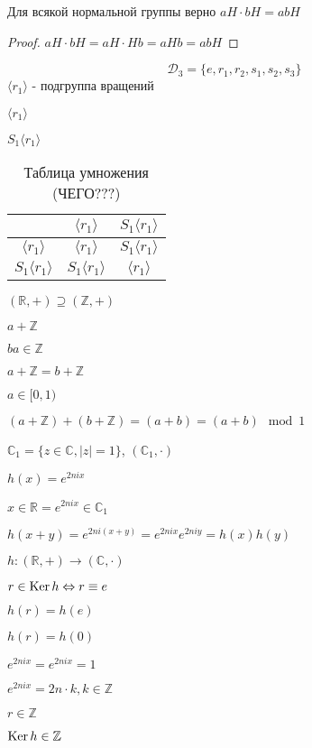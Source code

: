 \documentclass[../main/document.tex]{subfiles}
\begin{document}
\begin{cnsq}
Для всякой нормальной группы верно $aH\cdot bH=abH$
\begin{proof}
$aH\cdot bH=aH\cdot Hb=aHb=abH$
\end{proof}
\end{cnsq}

\begin{exm}
$$\mathcal{D}_3=\{e,r_1,r_2,s_1,s_2,s_3\}$$
$\langle r_1\rangle$ - подгруппа вращений

$\langle r_1\rangle$

$S_1\langle r_1\rangle$

\begin{table}[h]
\centering
\caption*{Таблица умножения (ЧЕГО???)}
\renewcommand*{\arraystretch}{1.4}
\begin{tabular}{c|c|c}
  & $\langle r_1\rangle$ & $S_1\langle r_1\rangle$ \\ \hline
$\langle r_1\rangle$ & $\langle r_1\rangle$ & $S_1\langle r_1\rangle$ \\ \hline
$S_1\langle r_1\rangle$ & $S_1\langle r_1\rangle$ & $\langle r_1\rangle$  \\ 
\end{tabular}
\end{table}
\end{exm}

\begin{exm}
$(\mathbb{R},+)\supseteq (\mathbb{Z},+)$

$a+\mathbb{Z}$

$ba\in \mathbb{Z}$

$a+\mathbb{Z}=b+\mathbb{Z}$

$a\in [0,1)$

$(a+\mathbb{Z})+(b+\mathbb{Z})=(a+b)=(a+b)\mod 1$

$\mathbb{C}_1=\{z\in\mathbb{C},\vert z\vert=1\}$, $(\mathbb{C}_1,\cdot)$

$h(x)=e^{2nix}$

$x\in \mathbb{R}=e^{2nix}\in \mathbb{C}_1$

$h(x+y)=e^{2ni(x+y)}=e^{2nix}e^{2niy}=h(x)h(y)$

$h:(\mathbb{R},+)\rightarrow (\mathbb{C},\cdot)$

$r\in \operatorname{Ker} h \Leftrightarrow r\equiv e$

$h(r)=h(e)$

$h(r)=h(0)$

$e^{2nix}=e^{2nix}=1$

$e^{2nix}=2n\cdot k, k\in \mathbb{Z}$

$r\in \mathbb{Z}$

$\operatorname{Ker} h\in \mathbb{Z}$
\end{exm}
\end{document}
